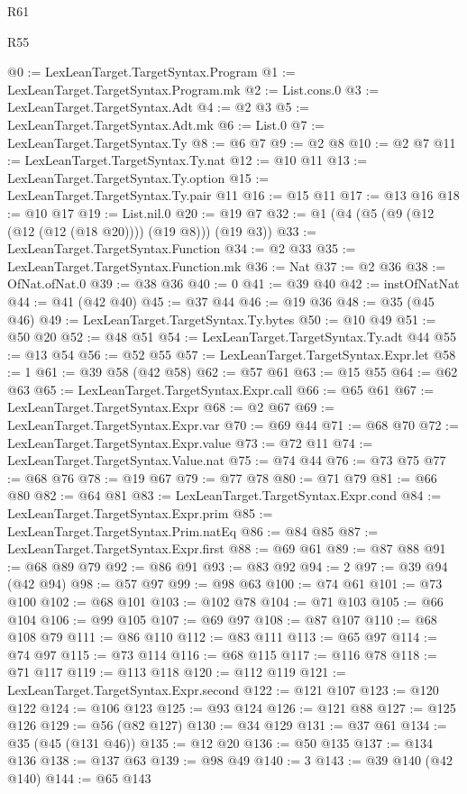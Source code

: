 \begin{lexlean}{R61}
\begin{lexlean}{R55}
\begin{coremodule}
{{{{{{{{{{{{{{{{{{{{{{{{{{{{{{{{{{{{{{{{{{{{{{{{{{{{{{{{{{{{@0 := LexLeanTarget.TargetSyntax.Program
@1 := LexLeanTarget.TargetSyntax.Program.mk
@2 := List.cons.{0}
@3 := LexLeanTarget.TargetSyntax.Adt
@4 := @2 @3
@5 := LexLeanTarget.TargetSyntax.Adt.mk
@6 := List.{0}
@7 := LexLeanTarget.TargetSyntax.Ty
@8 := @6 @7
@9 := @2 @8
@10 := @2 @7
@11 := LexLeanTarget.TargetSyntax.Ty.nat
@12 := @10 @11
@13 := LexLeanTarget.TargetSyntax.Ty.option
@15 := LexLeanTarget.TargetSyntax.Ty.pair @11
@16 := @15 @11
@17 := @13 @16
@18 := @10 @17
@19 := List.nil.{0}
@20 := @19 @7
@32 := @1 (@4 (@5 (@9 (@12 (@12 (@12 (@18 @20)))) (@19 @8))) (@19 @3))
@33 := LexLeanTarget.TargetSyntax.Function
@34 := @2 @33
@35 := LexLeanTarget.TargetSyntax.Function.mk
@36 := Nat
@37 := @2 @36
@38 := OfNat.ofNat.{0}
@39 := @38 @36
@40 := 0
@41 := @39 @40
@42 := instOfNatNat
@44 := @41 (@42 @40)
@45 := @37 @44
@46 := @19 @36
@48 := @35 (@45 @46)
@49 := LexLeanTarget.TargetSyntax.Ty.bytes
@50 := @10 @49
@51 := @50 @20
@52 := @48 @51
@54 := LexLeanTarget.TargetSyntax.Ty.adt @44
@55 := @13 @54
@56 := @52 @55
@57 := LexLeanTarget.TargetSyntax.Expr.let
@58 := 1
@61 := @39 @58 (@42 @58)
@62 := @57 @61
@63 := @15 @55
@64 := @62 @63
@65 := LexLeanTarget.TargetSyntax.Expr.call
@66 := @65 @61
@67 := LexLeanTarget.TargetSyntax.Expr
@68 := @2 @67
@69 := LexLeanTarget.TargetSyntax.Expr.var
@70 := @69 @44
@71 := @68 @70
@72 := LexLeanTarget.TargetSyntax.Expr.value
@73 := @72 @11
@74 := LexLeanTarget.TargetSyntax.Value.nat
@75 := @74 @44
@76 := @73 @75
@77 := @68 @76
@78 := @19 @67
@79 := @77 @78
@80 := @71 @79
@81 := @66 @80
@82 := @64 @81
@83 := LexLeanTarget.TargetSyntax.Expr.cond
@84 := LexLeanTarget.TargetSyntax.Expr.prim
@85 := LexLeanTarget.TargetSyntax.Prim.natEq
@86 := @84 @85
@87 := LexLeanTarget.TargetSyntax.Expr.first
@88 := @69 @61
@89 := @87 @88
@91 := @68 @89 @79
@92 := @86 @91
@93 := @83 @92
@94 := 2
@97 := @39 @94 (@42 @94)
@98 := @57 @97
@99 := @98 @63
@100 := @74 @61
@101 := @73 @100
@102 := @68 @101
@103 := @102 @78
@104 := @71 @103
@105 := @66 @104
@106 := @99 @105
@107 := @69 @97
@108 := @87 @107
@110 := @68 @108 @79
@111 := @86 @110
@112 := @83 @111
@113 := @65 @97
@114 := @74 @97
@115 := @73 @114
@116 := @68 @115
@117 := @116 @78
@118 := @71 @117
@119 := @113 @118
@120 := @112 @119
@121 := LexLeanTarget.TargetSyntax.Expr.second
@122 := @121 @107
@123 := @120 @122
@124 := @106 @123
@125 := @93 @124
@126 := @121 @88
@127 := @125 @126
@129 := @56 (@82 @127)
@130 := @34 @129
@131 := @37 @61
@134 := @35 (@45 (@131 @46))
@135 := @12 @20
@136 := @50 @135
@137 := @134 @136
@138 := @137 @63
@139 := @98 @49
@140 := 3
@143 := @39 @140 (@42 @140)
@144 := @65 @143
}}}}}}}}}}}}}}}}}}}}}}}}}}}}}}}}}}}}}}}}}}}}}}}}}}}}}}}}}}}}
\end{coremodule}
\end{lexlean}
\end{lexlean}
